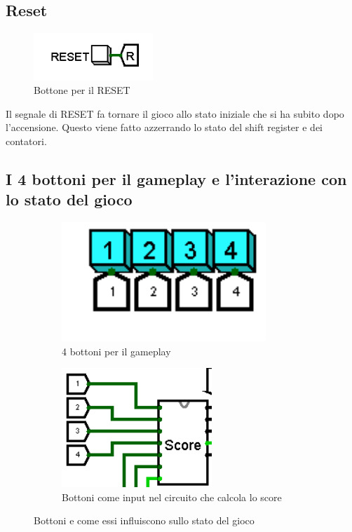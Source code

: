 \documentclass[11pt]{article}
\begin{document}
\subsection{Reset}

\begin{figure}[!htpb]
\centering
\includegraphics[width=0.4\textwidth, center]{immagini/reset}
\caption{Bottone per il RESET}
\label{fig:fig12}
\end{figure}

Il segnale di RESET fa tornare il gioco allo stato iniziale che si ha subito dopo l'accensione.
Questo viene fatto azzerrando lo stato del shift register e dei contatori.

\pagebreak 

\subsection{I 4 bottoni per il gameplay e l'interazione con lo stato del gioco}

\begin{figure}[h]
\begin{subfigure}{0.4\textwidth}
\includegraphics[width=0.8\linewidth, height=4.5cm]{immagini/bottoni} 
\caption{4 bottoni per il gameplay}
\label{fig:subfig7}
\end{subfigure}
\begin{subfigure}{0.5\textwidth}
\includegraphics[width=1\linewidth, height=4.5cm]{immagini/input_score}
\caption{Bottoni come input nel circuito che calcola lo score}
\label{fig:subfig8}
\end{subfigure}
\caption{Bottoni e come essi influiscono sullo stato del gioco}
\label{fig:fig13}
\end{figure}
\end{document}

